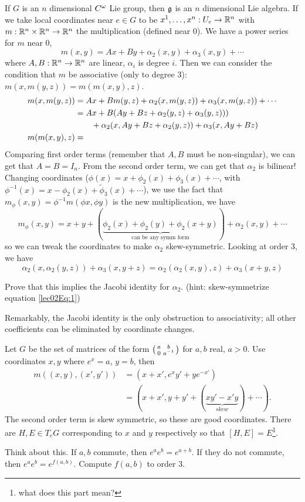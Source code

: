  If $G$ is an $n$ dimensional $C^\w$ Lie group, then $\g$ is an $n$ dimensional Lie algebra.
 If we take local coordinates near $e\in G$ to be $x^1,\dots, x^n:U_e\to \RR^n$ with
 $m:\RR^n\times \RR^n\to \RR^n$ the multiplication (defined near 0). We have a power
 series for $m$ near 0,
 \[
    m(x,y) = Ax+By+\alpha_2(x,y)+\alpha_3(x,y)+\cdots
 \]
 where $A,B:\RR^n\to \RR^n$ are linear, $\alpha_i$ is degree $i$. Then we can consider
 the condition that $m$ be associative (only to degree 3): $m(x,m(y,z))=m(m(x,y),z)$.
 \begin{align*}
   m(x,m(y,z)) &= Ax+Bm(y,z)+\alpha_2(x,m(y,z))+\alpha_3(x,m(y,z))+\cdots\\
        &=
        Ax+B(Ay+Bz+\alpha_2(y,z)+\alpha_3(y,z)))\\
        &\qquad +\alpha_2(x,Ay+Bz+\alpha_2(y,z))+\alpha_3(x,Ay+Bz)\\
   m(m(x,y),z) &= \anton{\text{compute this stuff}}
 \end{align*}
 Comparing first order terms (remember that $A,B$ must be non-singular), we can get that
 $A=B=I_n$. From the second order term, we can get that $\alpha_2$ is bilinear!
 Changing coordinates ($\phi(x)=x+\phi_2(x)+\phi_3(x)+\cdots$, with
 $\phi^{-1}(x)=x-\phi_2(x)+\tilde\phi_3(x)+\cdots$), we use the fact that
 $m_\phi(x,y)=\phi^{-1}m(\phi x,\phi y)$ is the new multiplication, we have
 \[
    m_\phi(x,y) = x+y + (\underbrace{\phi_2 (x) +\phi_2 (y)+\phi_2 (x+y)}_{\text{can
    be any symm form}}) + \alpha_2(x,y)+ \cdots
 \]
 so we can tweak the coordinates to make $\alpha_2$ skew-symmetric. Looking at order 3, we
 have
 \begin{equation}\label{lec02Eq:1}
  \alpha_2(x,\alpha_2(y,z))+\alpha_3(x,y+z) =
  \alpha_2(\alpha_2(x,y),z)+\alpha_3(x+y,z)
 \end{equation}
 \begin{exercise}
   Prove that this implies the Jacobi identity for $\alpha_2$. (hint: skew-symmetrize
   equation \ref{lec02Eq:1})
 \end{exercise}
 Remarkably, the Jacobi identity is the only obstruction to associativity; all
 other coefficients can be eliminated by coordinate changes.

 \begin{example}
   Let $G$ be the set of matrices of the form $\matrix{a}{b}{0}{a^{-1}}$ for $a,b$
   real, $a>0$. Use coordinates $x,y$ where $e^x=a$, $y=b$, then
   \begin{align*}
      m((x,y),(x',y')) &= (x+x',e^xy'+ye^{-x'})\\
              &= (x+x',y+y'+ (\underbrace{xy'-x'y}_{skew})+ \cdots).
   \end{align*}
   The second order term is skew symmetric, so these are good coordinates. There are
   $H,E\in T_eG$ corresponding to $x$ and $y$ respectively so that
   $[H,E]=E$\footnote{what does this part mean?}.
 \end{example}

 \begin{exercise}
    Think about this. If $a,b$ commute, then $e^ae^b=e^{a+b}$. If
    they do not commute, then $e^ae^b=e^{f(a,b)}$. Compute $f(a,b)$ to order 3.
 \end{exercise}
